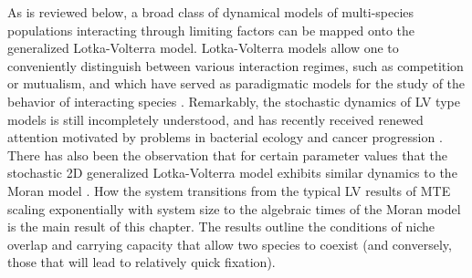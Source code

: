 As is reviewed below, a broad class of dynamical models of multi-species populations interacting through limiting factors can be mapped onto the generalized Lotka-Volterra model. 
Lotka-Volterra models allow one to conveniently distinguish between various interaction regimes, such as competition or mutualism, and which have served as paradigmatic models for the study of the behavior of interacting species \cite{Volterra1926,Bomze1983,Chesson1990,Antal2006,Chotibut2015,Dobrinevski2012,Fisher2014,Constable2015,Lin2012,Gabel2013,Kessler2015,Young2018}. 
Remarkably, the stochastic dynamics of LV type models is still incompletely understood, and has recently received renewed attention motivated by problems in bacterial ecology and cancer progression \cite{VanMelderen2009,Stirk2010,Fisher2014,Chotibut2015,Capitan2017,Kessler2014}. %
There has also been the observation that for certain parameter values that the stochastic 2D generalized Lotka-Volterra model exhibits similar dynamics to the Moran model \cite{Lin2012,Constable2015,Chotibut2015,Young2018}. 
How the system transitions from the typical LV results of MTE scaling exponentially with system size to the algebraic times of the Moran model is the main result of this chapter. 
The results outline the conditions of niche overlap and carrying capacity that allow two species to coexist (and conversely, those that will lead to relatively quick fixation). 


